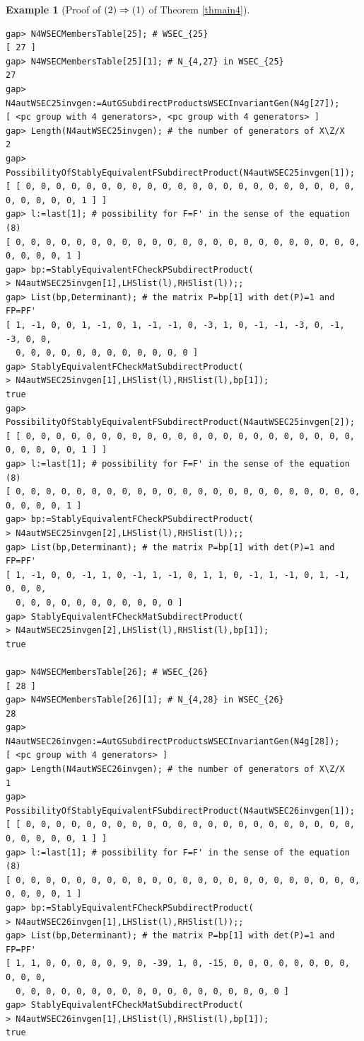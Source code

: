 \documentclass{amsart}
\theoremstyle{plain}
\theoremstyle{definition}
\newtheorem{example}[theorem]{Example}
\theoremstyle{remark}
\begin{document}
\begin{example}[Proof of ${\rm (2)}\Rightarrow {\rm (1)}$ of {Theorem \ref{thmain4}}]
\begin{verbatim}
gap> N4WSECMembersTable[25]; # WSEC_{25}
[ 27 ]
gap> N4WSECMembersTable[25][1]; # N_{4,27} in WSEC_{25}
27
gap> N4autWSEC25invgen:=AutGSubdirectProductsWSECInvariantGen(N4g[27]);
[ <pc group with 4 generators>, <pc group with 4 generators> ]
gap> Length(N4autWSEC25invgen); # the number of generators of X\Z/X
2
gap> PossibilityOfStablyEquivalentFSubdirectProduct(N4autWSEC25invgen[1]);
[ [ 0, 0, 0, 0, 0, 0, 0, 0, 0, 0, 0, 0, 0, 0, 0, 0, 0, 0, 0, 0, 0, 0, 0, 0, 0, 0, 0, 1 ] ]
gap> l:=last[1]; # possibility for F=F' in the sense of the equation (8)
[ 0, 0, 0, 0, 0, 0, 0, 0, 0, 0, 0, 0, 0, 0, 0, 0, 0, 0, 0, 0, 0, 0, 0, 0, 0, 0, 0, 1 ]
gap> bp:=StablyEquivalentFCheckPSubdirectProduct(
> N4autWSEC25invgen[1],LHSlist(l),RHSlist(l));;
gap> List(bp,Determinant); # the matrix P=bp[1] with det(P)=1 and FP=PF'
[ 1, -1, 0, 0, 1, -1, 0, 1, -1, -1, 0, -3, 1, 0, -1, -1, -3, 0, -1, -3, 0, 0, 
  0, 0, 0, 0, 0, 0, 0, 0, 0, 0, 0, 0 ]
gap> StablyEquivalentFCheckMatSubdirectProduct(
> N4autWSEC25invgen[1],LHSlist(l),RHSlist(l),bp[1]);
true
gap> PossibilityOfStablyEquivalentFSubdirectProduct(N4autWSEC25invgen[2]);
[ [ 0, 0, 0, 0, 0, 0, 0, 0, 0, 0, 0, 0, 0, 0, 0, 0, 0, 0, 0, 0, 0, 0, 0, 0, 0, 0, 0, 1 ] ]
gap> l:=last[1]; # possibility for F=F' in the sense of the equation (8)
[ 0, 0, 0, 0, 0, 0, 0, 0, 0, 0, 0, 0, 0, 0, 0, 0, 0, 0, 0, 0, 0, 0, 0, 0, 0, 0, 0, 1 ]
gap> bp:=StablyEquivalentFCheckPSubdirectProduct(
> N4autWSEC25invgen[2],LHSlist(l),RHSlist(l));;
gap> List(bp,Determinant); # the matrix P=bp[1] with det(P)=1 and FP=PF'
[ 1, -1, 0, 0, -1, 1, 0, -1, 1, -1, 0, 1, 1, 0, -1, 1, -1, 0, 1, -1, 0, 0, 0, 
  0, 0, 0, 0, 0, 0, 0, 0, 0, 0, 0 ]
gap> StablyEquivalentFCheckMatSubdirectProduct(
> N4autWSEC25invgen[2],LHSlist(l),RHSlist(l),bp[1]);
true

gap> N4WSECMembersTable[26]; # WSEC_{26}
[ 28 ]
gap> N4WSECMembersTable[26][1]; # N_{4,28} in WSEC_{26}
28
gap> N4autWSEC26invgen:=AutGSubdirectProductsWSECInvariantGen(N4g[28]);
[ <pc group with 4 generators> ]
gap> Length(N4autWSEC26invgen); # the number of generators of X\Z/X
1
gap> PossibilityOfStablyEquivalentFSubdirectProduct(N4autWSEC26invgen[1]);
[ [ 0, 0, 0, 0, 0, 0, 0, 0, 0, 0, 0, 0, 0, 0, 0, 0, 0, 0, 0, 0, 0, 0, 0, 0, 0, 0, 0, 1 ] ]
gap> l:=last[1]; # possibility for F=F' in the sense of the equation (8)
[ 0, 0, 0, 0, 0, 0, 0, 0, 0, 0, 0, 0, 0, 0, 0, 0, 0, 0, 0, 0, 0, 0, 0, 0, 0, 0, 0, 1 ]
gap> bp:=StablyEquivalentFCheckPSubdirectProduct(
> N4autWSEC26invgen[1],LHSlist(l),RHSlist(l));;
gap> List(bp,Determinant); # the matrix P=bp[1] with det(P)=1 and FP=PF'
[ 1, 1, 0, 0, 0, 0, 0, 9, 0, -39, 1, 0, -15, 0, 0, 0, 0, 0, 0, 0, 0, 0, 0, 0, 
  0, 0, 0, 0, 0, 0, 0, 0, 0, 0, 0, 0, 0, 0, 0, 0, 0, 0 ]
gap> StablyEquivalentFCheckMatSubdirectProduct(
> N4autWSEC26invgen[1],LHSlist(l),RHSlist(l),bp[1]);
true


\end{verbatim}
\end{example}
\end{document}
